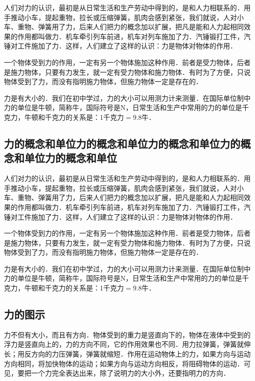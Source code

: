 人们对力的认识，最初是从日常生活和生产劳动中得到的，是和人力相联系的．用手推动小车，提起重物，拉长或压缩弹簧，肌肉会感到紧张，我们就说，人对小车、重物、弹簧用了力，后来人们把力的概念加以扩展，把凡是能和人力起相同效果的作用都叫做力．机车牵引列车前进，机车对列车施加了力．汽锤锻打工件，汽锤对工件施加了力．这样，人们建立了这样的认识：\textsf{力是物体对物体的作用}．

一个物体受到力的作用，一定有另一个物体施加这种作用．前者是受力物体，后者是施力物体，只要有力发生，就一定有受力物体和施力物体．有时为了方便，只说物体受到了力，而没有指明施力物体，但施力物体一定是存在的．

力是有大小的．我们在初中学过，力的大小可以用测力计来测量．在国际单位制中力的单位是\textsf{牛顿}，简称牛，国际符号是N，日常生活和生产中常用的力的单位是千克力，牛顿和千克力的关系是：1千克力$=9.8$牛．



\subsection{力的概念和单位力的概念和单位力的概念和单位力的概念和单位力的概念和单位}




人们对力的认识，最初是从日常生活和生产劳动中得到的，是和人力相联系的．用手推动小车，提起重物，拉长或压缩弹簧，肌肉会感到紧张，我们就说，人对小车、重物、弹簧用了力，后来人们把力的概念加以扩展，把凡是能和人力起相同效果的作用都叫做力．机车牵引列车前进，机车对列车施加了力．汽锤锻打工件，汽锤对工件施加了力．这样，人们建立了这样的认识：\textsf{力是物体对物体的作用}．

一个物体受到力的作用，一定有另一个物体施加这种作用．前者是受力物体，后者是施力物体，只要有力发生，就一定有受力物体和施力物体．有时为了方便，只说物体受到了力，而没有指明施力物体，但施力物体一定是存在的．

力是有大小的．我们在初中学过，力的大小可以用测力计来测量．在国际单位制中力的单位是\textsf{牛顿}，简称牛，国际符号是N，日常生活和生产中常用的力的单位是千克力，牛顿和千克力的关系是：1千克力$=9.8$牛．



\subsection{力的图示}

力不但有大小，而且有方向．物体受到的重力是竖直向下的，物体在液体中受到的浮力是竖直向上的，力的方向不同，它的作用效果也不同．用力拉弹簧，弹簧就伸长；用反方向的力压弹簧，弹簧就缩短．作用在运动物体上的力，如果方向与运动方向相同，将加快物体的运动；如果方向与运动方向相反，将阻碍物体的运动．可见，要把一个力完全表达出来，除了说明力的大小外，还要指明力的方向．

